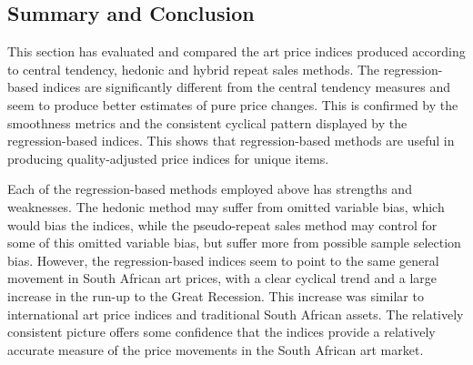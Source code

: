 \documentclass[12pt,]{article}
\begin{document}
\begin{table}[ht]
\centering
\caption{Correlations of returns (dlogs)} 
\end{table}

\subsection{Summary and Conclusion}\label{summary-and-conclusion}

This section has evaluated and compared the art price indices produced
according to central tendency, hedonic and hybrid repeat sales methods.
The regression-based indices are significantly different from the
central tendency measures and seem to produce better estimates of pure
price changes. This is confirmed by the smoothness metrics and the
consistent cyclical pattern displayed by the regression-based indices.
This shows that regression-based methods are useful in producing
quality-adjusted price indices for unique items.

Each of the regression-based methods employed above has strengths and
weaknesses. The hedonic method may suffer from omitted variable bias,
which would bias the indices, while the pseudo-repeat sales method may
control for some of this omitted variable bias, but suffer more from
possible sample selection bias. However, the regression-based indices
seem to point to the same general movement in South African art prices,
with a clear cyclical trend and a large increase in the run-up to the
Great Recession. This increase was similar to international art price
indices and traditional South African assets. The relatively consistent
picture offers some confidence that the indices provide a relatively
accurate measure of the price movements in the South African art market.
\end{document}
